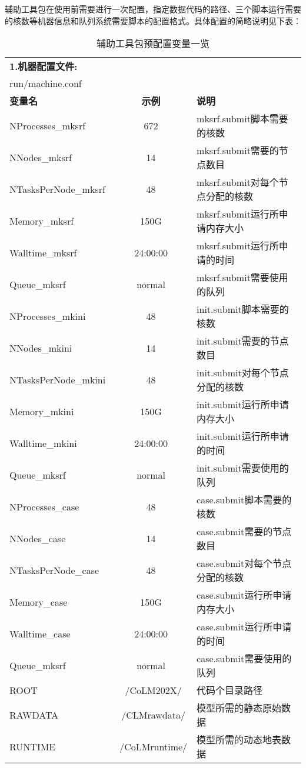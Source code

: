 \documentclass[a4paper,12pt,twoside]{article}
\begin{document}
辅助工具包在使用前需要进行一次配置，指定数据代码的路径、三个脚本运行需要的核数等机器信息和队列系统需要脚本的配置格式。具体配置的简略说明见下表：

\begin{table}[!htbp]
\caption{辅助工具包预配置变量一览} \label{table_toolbox}
\centering \renewcommand{\arraystretch}{1.2}
\begin{tabular}{lcp{}}
\toprule
\textbf{1.机器配置文件:} && \\ 
run\slash machine.conf && \\
\textbf{变量名} & \textbf{示例} & \textbf{说明} \\
NProcesses\_mksrf & 672 & mksrf.submit脚本需要的核数 \\
NNodes\_mksrf & 14 & mksrf.submit需要的节点数目 \\
NTasksPerNode\_mksrf & 48 & mksrf.submit对每个节点分配的核数 \\
Memory\_mksrf & 150G & mksrf.submit运行所申请内存大小 \\
Walltime\_mksrf & 24:00:00 & mksrf.submit运行所申请的时间 \\
Queue\_mksrf & normal & mksrf.submit需要使用的队列 \\
NProcesses\_mkini & 48 &init.submit脚本需要的核数 \\
NNodes\_mkini & 14 & init.submit需要的节点数目 \\
NTasksPerNode\_mkini & 48 & init.submit对每个节点分配的核数 \\
Memory\_mkini & 150G & init.submit运行所申请内存大小 \\
Walltime\_mkini & 24:00:00 & init.submit运行所申请的时间 \\
Queue\_mksrf & normal & init.submit需要使用的队列 \\
NProcesses\_case & 48 & case.submit脚本需要的核数 \\
NNodes\_case & 14 & case.submit需要的节点数目 \\
NTasksPerNode\_case & 48 & case.submit对每个节点分配的核数 \\
Memory\_case & 150G & case.submit运行所申请内存大小 \\
Walltime\_case & 24:00:00 & case.submit运行所申请的时间 \\
Queue\_mksrf & normal & case.submit需要使用的队列 \\
ROOT & ~/CoLM202X/ & 代码个目录路径 \\
RAWDATA & ~/CLMrawdata/ & 模型所需的静态原始数据 \\
RUNTIME & ~/CoLMruntime/ & 模型所需的动态地表数据 \\

\end{tabular}
\end{table}
\end{document}
